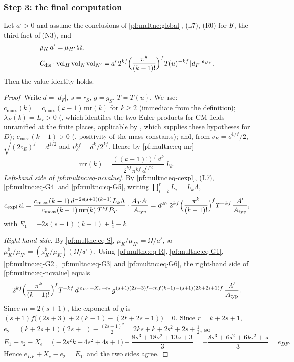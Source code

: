 \subsubsection*{Step 3: the final computation}

\begin{proposition}\label{pf:multnc:final}
Let $a'>0$ and assume the conclusions of \cref{pf:multnc:global}, (L7), (R0) for $\mathcal{B}$, the third fact of (N3), and
\begin{align}
&\mu_K\,a'=\mu_{H'}\,\Omega,\label{pf:multnc:eq-S}\\
&C_{\mathrm{dis}}\cdot\mathrm{vol}_H\,\mathrm{vol}_N\,\mathrm{vol}_{N'}=a'\,2^{kf}\Bigl(\frac{\pi^k}{(k-1)!}\Bigr)^{f}
T(u)^{-kf}\,|d_F|^{e_{DF}}.\label{pf:multnc:eq-R}
\end{align}
Then the value identity  holds.
\end{proposition}

\begin{proof}
Write $d=|d_F|$, $s=r_S$, $g=g_S$, $T=T(u)$. We use: $c_{\mathrm{mass}}(k)=c_{\mathrm{mass}}(k-1)\,\mathrm{mr}(k)$ for $k\ge2$
(immediate from the definition); $\lambda_E(k)=L_k>0$ (,
which identifies the two Euler products for CM fields unramified at the finite places, applicable by
, which supplies these hypotheses for $D$); $c_{\mathrm{mass}}(k-1)>0$
(, positivity of the mass constants); and, from $v_E=d^{1/f}/2$,
$\sqrt{(2v_E)^f}=d^{1/2}$ and $v_E^{kf}=d^k/2^{kf}$. Hence by \eqref{pf:multnc:eq-mr}
\[
\mathrm{mr}(k)=\frac{((k-1)!)^f\,d^k}{2^{kf}\pi^{kf}\,d^{1/2}}\,L_k .
\]
\emph{Left-hand side of \eqref{pf:multnc:eq-ncvalue}.} By \eqref{pf:multnc:eq-cexpl}, (L7), \eqref{pf:multnc:eq-G4} and
\eqref{pf:multnc:eq-G5}, writing $\prod_{i=k}^rL_i=L_k\Lambda$,
\[
c_{\mathrm{expl}}\,\mathrm{al}=\frac{c_{\mathrm{mass}}(k-1)\,d^{-2s(s+1)(k-1)}L_k\Lambda}{c_{\mathrm{mass}}(k-1)\,\mathrm{mr}(k)\,
T^{kf}P_T}\cdot\frac{A_TA'}{A_{\mathrm{typ}}}
=d^{E_1}\,2^{kf}\Bigl(\frac{\pi^k}{(k-1)!}\Bigr)^{f}T^{-kf}\,\frac{A'}{A_{\mathrm{typ}}},
\]
with $E_1=-2s(s+1)(k-1)+\frac12-k$.

\emph{Right-hand side.} By \eqref{pf:multnc:eq-S}, $\mu_K/\mu_{H'}=\Omega/a'$, so
$\mu_K^\natural/\mu_{H'}=(\mu_K^\natural/\mu_K)(\Omega/a')$. Using \eqref{pf:multnc:eq-R}, \eqref{pf:multnc:eq-G1},
\eqref{pf:multnc:eq-G2}, \eqref{pf:multnc:eq-G3} and \eqref{pf:multnc:eq-G6}, the right-hand side of
\eqref{pf:multnc:eq-ncvalue} equals
\[
2^{kf}\Bigl(\frac{\pi^k}{(k-1)!}\Bigr)^{f}T^{-kf}\,d^{\,e_{DF}+X_e-e_2}\,
g^{(s+1)(2s+3)f+mf(k-1)-(s+1)(2k+2s+1)f}\,\frac{A'}{A_{\mathrm{typ}}}.
\]
Since $m=2(s+1)$, the exponent of $g$ is $(s+1)f\bigl((2s+3)+2(k-1)-(2k+2s+1)\bigr)=0$. Since $r=k+2s+1$,
$e_2=(k+2s+1)(2s+1)-\frac{(2s+1)^2}2=2ks+k+2s^2+2s+\frac12$, so
\[
E_1+e_2-X_e=\bigl(-2s^2k+4s^2+4s+1\bigr)-\frac{8s^3+18s^2+13s+3}{3}=-\frac{8s^3+6s^2+6ks^2+s}{3}=e_{DF}.
\]
Hence $e_{DF}+X_e-e_2=E_1$, and the two sides agree.
\end{proof}

